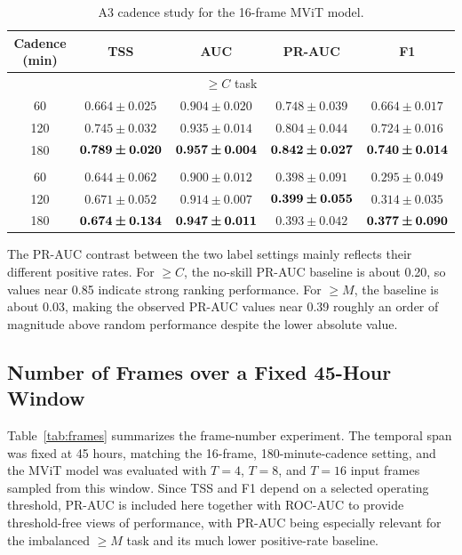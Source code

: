 \documentclass[runningheads]{llncs}
\begin{document}
\begin{table}[H]
\caption{A3 cadence study for the 16-frame MViT model.}
\centering
\label{tab:video}
\scriptsize
\setlength{\tabcolsep}{4pt}
\begin{tabular}{@{}ccccc@{}}
\toprule
Cadence (min) & TSS & AUC & PR-AUC & F1 \\
\midrule
\multicolumn{5}{c}{$\geq C$ task} \\
\midrule
60  & $0.664 \pm 0.025$ & $0.904 \pm 0.020$ & $0.748 \pm 0.039$ & $0.664 \pm 0.017$ \\
120 & $0.745 \pm 0.032$ & $0.935 \pm 0.014$ & $0.804 \pm 0.044$ & $0.724 \pm 0.016$ \\
180 & $\bm{0.789 \pm 0.020}$ & $\bm{0.957 \pm 0.004}$ & $\bm{0.842 \pm 0.027}$ & $\bm{0.740 \pm 0.014}$ \\
\addlinespace
\multicolumn{5}{c}{$\geq M$ task} \\
\midrule
60  & $0.644 \pm 0.062$ & $0.900 \pm 0.012$ & $0.398 \pm 0.091$ & $0.295 \pm 0.049$ \\
120 & $0.671 \pm 0.052$ & $0.914 \pm 0.007$ & $\bm{0.399 \pm 0.055}$ & $0.314 \pm 0.035$ \\
180 & $\bm{0.674 \pm 0.134}$ & $\bm{0.947 \pm 0.011}$ & $0.393 \pm 0.042$ & $\bm{0.377 \pm 0.090}$ \\
\bottomrule
\end{tabular}
\end{table}

The PR-AUC contrast between the two label settings mainly reflects their different positive rates. For $\geq C$, the no-skill PR-AUC baseline is about 0.20, so values near 0.85 indicate strong ranking performance. For $\geq M$, the baseline is about 0.03, making the observed PR-AUC values near 0.39 roughly an order of magnitude above random performance despite the lower absolute value.

\subsection{Number of Frames over a Fixed 45-Hour Window}

Table~\ref{tab:frames} summarizes the frame-number experiment. The temporal span was fixed at 45 hours, matching the 16-frame, 180-minute-cadence setting, and the MViT model was evaluated with $T=4$, $T=8$, and $T=16$ input frames sampled from this window. Since TSS and F1 depend on a selected operating threshold, PR-AUC is included here together with ROC-AUC to provide threshold-free views of performance, with PR-AUC being especially relevant for the imbalanced $\geq M$ task and its much lower positive-rate baseline.
\end{document}
